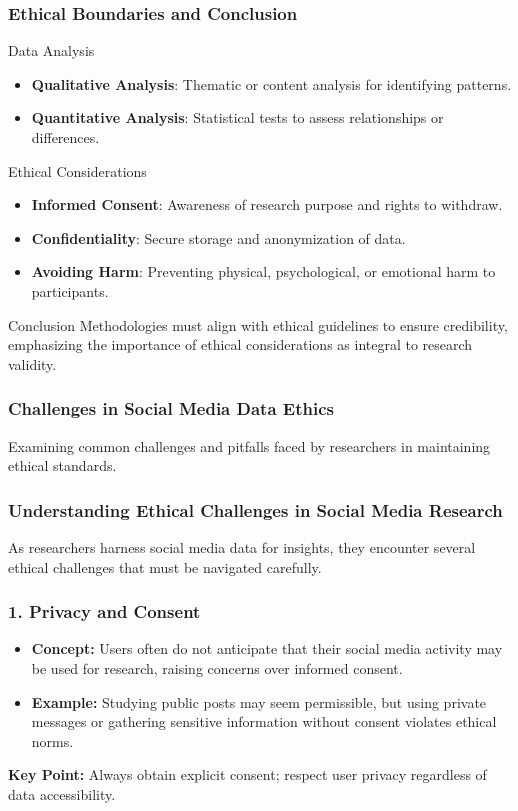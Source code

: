 \documentclass{beamer}
\begin{document}
\begin{frame}[fragile]
    \frametitle{Ethical Boundaries and Conclusion}

    \begin{block}{Data Analysis}
        \begin{itemize}
            \item \textbf{Qualitative Analysis}: Thematic or content analysis for identifying patterns.
            \item \textbf{Quantitative Analysis}: Statistical tests to assess relationships or differences.
        \end{itemize}
    \end{block}

    \begin{block}{Ethical Considerations}
        \begin{itemize}
            \item \textbf{Informed Consent}: Awareness of research purpose and rights to withdraw.
            \item \textbf{Confidentiality}: Secure storage and anonymization of data.
            \item \textbf{Avoiding Harm}: Preventing physical, psychological, or emotional harm to participants.
        \end{itemize}
    \end{block}

    \begin{block}{Conclusion}
        Methodologies must align with ethical guidelines to ensure credibility, emphasizing the importance of ethical considerations as integral to research validity.
    \end{block}
\end{frame}

\begin{frame}[fragile]
    \frametitle{Challenges in Social Media Data Ethics}
    Examining common challenges and pitfalls faced by researchers in maintaining ethical standards.
\end{frame}

\begin{frame}[fragile]
    \frametitle{Understanding Ethical Challenges in Social Media Research}
    As researchers harness social media data for insights, they encounter several ethical challenges that must be navigated carefully. 
\end{frame}

\begin{frame}[fragile]
    \frametitle{1. Privacy and Consent}
    \begin{itemize}
        \item \textbf{Concept:} Users often do not anticipate that their social media activity may be used for research, raising concerns over informed consent.
        \item \textbf{Example:} Studying public posts may seem permissible, but using private messages or gathering sensitive information without consent violates ethical norms.
    \end{itemize}
    \textbf{Key Point:} Always obtain explicit consent; respect user privacy regardless of data accessibility.
\end{frame}
\end{document}
